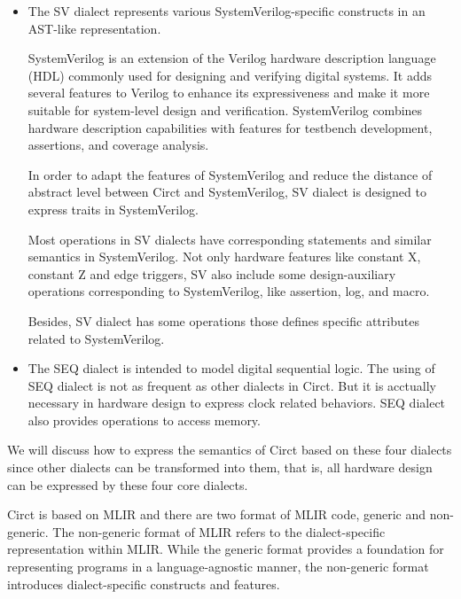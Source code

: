 \begin{itemize}
    \item The SV dialect represents various SystemVerilog-specific constructs in an AST-like representation.
    
    SystemVerilog is an extension of the Verilog hardware description language (HDL) commonly used for designing and verifying digital systems. It adds several features to Verilog to enhance its expressiveness and make it more suitable for system-level design and verification. SystemVerilog combines hardware description capabilities with features for testbench development, assertions, and coverage analysis.

    In order to adapt the features of SystemVerilog and reduce the distance of abstract level between Circt and SystemVerilog, SV dialect is designed to express traits in SystemVerilog.

    Most operations in SV dialects have corresponding statements and similar semantics in SystemVerilog. Not only hardware features like constant X, constant Z and edge triggers, SV also include some design-auxiliary operations corresponding to SystemVerilog, like assertion, log, and macro.

    Besides, SV dialect has some operations those defines specific attributes related to SystemVerilog.

    \item The SEQ dialect is intended to model digital sequential logic. The using of SEQ dialect is not as frequent as other dialects in Circt. But it is acctually necessary in hardware design to express clock related behaviors. SEQ dialect also provides operations to access memory.
\end{itemize}

We will discuss how to express the semantics of Circt based on these four dialects since other dialects can be transformed into them, that is, all hardware design can be expressed by these four core dialects.

Circt is based on MLIR and there are two format of MLIR code, generic and non-generic. The non-generic format of MLIR refers to the dialect-specific representation within MLIR. While the generic format provides a foundation for representing programs in a language-agnostic manner, the non-generic format introduces dialect-specific constructs and features.

